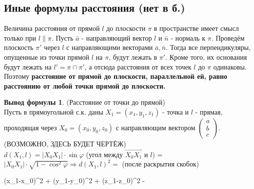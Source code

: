 \documentclass[a4paper, 12pt]{article}
\renewcommand{\phi}{\varphi}
\theoremstyle{definition}
\newtheorem*{formula}{Вывод формулы}
\newenvironment{boxedalign*}
  {\begin{equation*}\begin{lrbox}{\boxedalignbox}$\begin{aligned}}
  {\end{aligned}$\end{lrbox}\fbox{\usebox{\boxedalignbox}}\end{equation*}}
\begin{document}
	\subsection{Иные формулы расстояния (нет в б.)}
	Величина расстояния от прямой $l$ до плоскости $\pi$ в пространстве имеет смысл только при $l \parallel \pi$. Пусть $\bar{a}$ - направляющий вектор $l$ и $\bar{n}$ - нормаль к $\pi$. Проведём плоскость $\pi'$ через $l$ с направляющими векторами $\bar{a}, \bar{n}$. Тогда все перпендикуляры, опущенные из точки прямой $l$ на $\pi$, будут лежать в $\pi'$. Кроме того, их основания будут лежать на $l' = \pi \cap \pi'$, а отсюда расстояния от всех точек $l$ до $\pi$ одинаковы. Поэтому \bfseries расстояние от прямой до плоскости, параллельной ей, равно расстоянию от любой точки прямой до плоскости.\mdseries 
	\begin{formula}(Расстояние от точки до прямой)\\
		Пусть в прямоугольной с.к. даны $X_1 = (x_1, y_1, z_1)$ - точка и $l$ - прямая, проходящая через $X_0 = (x_0, y_0, z_0)$ с направляющим вектором $\begin{pmatrix}a\\b\\c\end{pmatrix}$.\\
		(ВОЗМОЖНО, ЗДЕСЬ БУДЕТ ЧЕРТЁЖ)\\
		$d(X_1, l) = |X_0X_1|\cdot\sin\phi$ (угол между $\overrightarrow{X_0X_1}$ и $l$) = $|X_0X_1|\cdot\sqrt{1 - \cos^2\phi} \Rightarrow d(X_1, l)^2 = $ (после раскрытия скобок)\begin{boxedalign*}
			(x_1-x_0)^2 + (y_1-y_0)^2 + (z_1-z_0)^2 -  
		\end{boxedalign*}
	\end{formula} 
\end{document}
